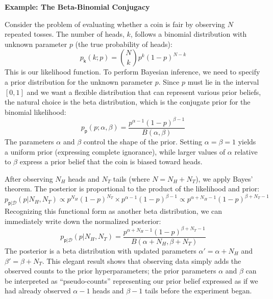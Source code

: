 \begin{exampleBox}
    \textbf{Example: The Beta-Binomial Conjugacy}

    Consider the problem of evaluating whether a coin is fair by observing $N$ repeated tosses. The number of heads, $k$, follows a binomial distribution with unknown parameter $p$ (the true probability of heads):
    \begin{equation}
        p_{\mathsf{k}}(k; p) = \binom{N}{k}p^k(1-p)^{N-k}
    \end{equation}
    This is our likelihood function. To perform Bayesian inference, we need to specify a prior distribution for the unknown parameter $p$. Since $p$ must lie in the interval $[0,1]$ and we want a flexible distribution that can represent various prior beliefs, the natural choice is the beta distribution, which is the conjugate prior for the binomial likelihood:
    \begin{equation}
        p_{\mathsf{p}}(p; \alpha, \beta) = \frac{p^{\alpha-1}(1-p)^{\beta-1}}{B(\alpha,\beta)}
    \end{equation}
    The parameters $\alpha$ and $\beta$ control the shape of the prior. Setting $\alpha = \beta = 1$ yields a uniform prior (expressing complete ignorance), while larger values of $\alpha$ relative to $\beta$ express a prior belief that the coin is biased toward heads.

    After observing $N_H$ heads and $N_T$ tails (where $N = N_H + N_T$), we apply Bayes' theorem. The posterior is proportional to the product of the likelihood and prior:
    \begin{equation}
        p_{\mathsf{p}|\mathcal{D}}(p|N_H, N_T) \propto p^{N_H}(1-p)^{N_T} \times p^{\alpha-1}(1-p)^{\beta-1} \propto p^{\alpha+N_H-1}(1-p)^{\beta+N_T-1}
    \end{equation}
    Recognizing this functional form as another beta distribution, we can immediately write down the normalized posterior:
    \begin{equation}
        p_{\mathsf{p}|\mathcal{D}}(p|N_H, N_T) = \frac{p^{\alpha+N_H-1}(1-p)^{\beta+N_T-1}}{B(\alpha+N_H, \beta+N_T)}
    \end{equation}
    The posterior is a beta distribution with updated parameters $\alpha' = \alpha + N_H$ and $\beta' = \beta + N_T$. This elegant result shows that observing data simply adds the observed counts to the prior hyperparameters; the prior parameters $\alpha$ and $\beta$ can be interpreted as ``pseudo-counts'' representing our prior belief expressed as if we had already observed $\alpha-1$ heads and $\beta-1$ tails before the experiment began.


\end{exampleBox}
